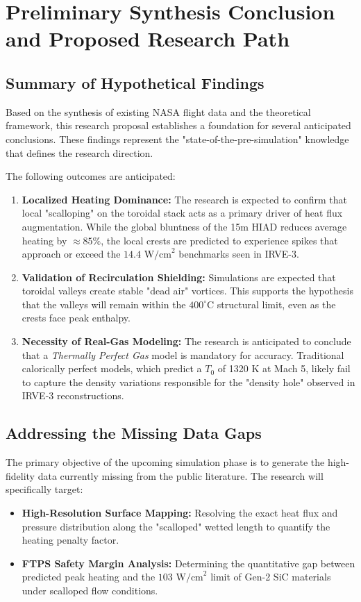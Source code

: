 \chapter{Preliminary Synthesis Conclusion and Proposed Research Path}

\section{Summary of Hypothetical Findings}
Based on the synthesis of existing NASA flight data and the theoretical framework, this research proposal establishes a foundation for several anticipated conclusions. These findings represent the "state-of-the-pre-simulation" knowledge that defines the research direction.

The following outcomes are anticipated:
\begin{enumerate}
    \item \textbf{Localized Heating Dominance:} The research is expected to confirm that local "scalloping" on the toroidal stack acts as a primary driver of heat flux augmentation. While the global bluntness of the 15m HIAD reduces average heating by $\approx 85\%$, the local crests are predicted to experience spikes that approach or exceed the $14.4 \text{ W/cm}^2$ benchmarks seen in IRVE-3.
    
    \item \textbf{Validation of Recirculation Shielding:} Simulations are expected that toroidal valleys create stable "dead air" vortices. This supports the hypothesis that the valleys will remain within the $400^\circ\text{C}$ structural limit, even as the crests face peak enthalpy.
    
    \item \textbf{Necessity of Real-Gas Modeling:} The research is anticipated to conclude that a \textit{Thermally Perfect Gas} model is mandatory for accuracy. Traditional calorically perfect models, which predict a $T_0$ of 1320 K at Mach 5, likely fail to capture the density variations responsible for the "density hole" observed in IRVE-3 reconstructions.
\end{enumerate}

\section{Addressing the Missing Data Gaps}
The primary objective of the upcoming simulation phase is to generate the high-fidelity data currently missing from the public literature. The research will specifically target:
\begin{itemize}
    \item \textbf{High-Resolution Surface Mapping:} Resolving the exact heat flux and pressure distribution along the "scalloped" wetted length to quantify the heating penalty factor.
    \item \textbf{FTPS Safety Margin Analysis:} Determining the quantitative gap between predicted peak heating and the $103 \text{ W/cm}^2$ limit of Gen-2 SiC materials under scalloped flow conditions.
\end{itemize}

